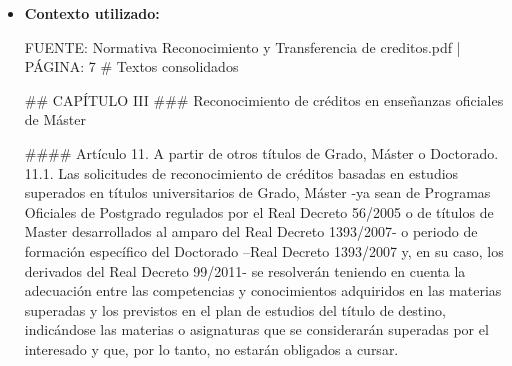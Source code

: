 \documentclass{article}
\begin{document}
\begin{itemize}
\begin{itemize}
                Recuerda que, en caso de desestimación, puedes interponer \textbf{recurso de alzada} ante el \textbf{Rector} de la Universidad de Sevilla.
          \item \textbf{Contexto utilizado:}
                \begin{scriptsize}
                  FUENTE: Normativa Reconocimiento y Transferencia de creditos.pdf | PÁGINA: 7
                  \# Textos consolidados

                  \#\# CAPÍTULO III
                  \#\#\# Reconocimiento de créditos en enseñanzas oficiales de Máster

                  \#\#\#\# Artículo 11. A partir de otros títulos de Grado, Máster o Doctorado.
                  11.1. Las solicitudes de reconocimiento de créditos basadas en estudios superados en títulos universitarios de Grado, Máster -ya sean de Programas Oficiales de Postgrado regulados por el Real Decreto 56/2005 o de títulos de Master desarrollados al amparo del Real Decreto 1393/2007- o periodo de formación específico del Doctorado –Real Decreto 1393/2007 y, en su caso, los derivados del Real Decreto 99/2011- se resolverán teniendo en cuenta la adecuación entre las competencias y conocimientos adquiridos en las materias superadas y los previstos en el plan de estudios del título de destino, indicándose las materias o asignaturas que se considerarán superadas por el interesado y que, por lo tanto, no estarán obligados a cursar.


\end{scriptsize}
\end{itemize}
\end{itemize}
\end{document}
